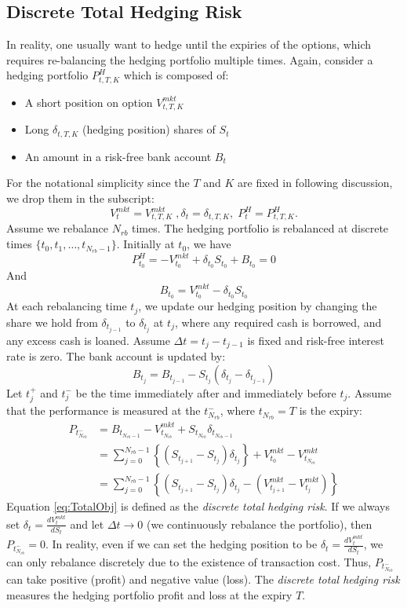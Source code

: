 \documentclass[letterpaper,12pt,titlepage,oneside,final]{book}
\numberwithin{equation}{section}
\theoremstyle{definition}
\newcommand{\Vmkt}{V^{mkt}}
\newcommand{\Smkt}{S}
\begin{document}
\subsection{Discrete Total Hedging Risk}
\label{sec:DiscreteTotalRisk}
In reality, one usually want to hedge until the expiries of the options, which requires re-balancing the hedging portfolio multiple times. Again,
consider a hedging portfolio $P^{H}_{t,T,K}$ which is composed of:
\begin{itemize}
	\item A short position on option $\Vmkt_{t,T,K}$
	\item Long $\delta_{t,T,K}$ (hedging position) shares of $\Smkt_t$
	\item An amount in a risk-free bank account $B_t$
\end{itemize}
For the notational simplicity since the $T$ and $K$ are fixed in following discussion, we drop them in the subscript:
\[
    \Vmkt_{t}=\Vmkt_{t,T,K}\;,\delta_{t}=\delta_{t,T,K},\; P^{H}_t=P^{H}_{t,T,K}.
\]
Assume we rebalance $N_{rb}$ times. The hedging portfolio is rebalanced at discrete times $\{t_0,t_1,\dots,t_{N_{rb}-1}\}$. 
Initially at $t_0$, we have
\[
P^H_{t_0}=  -V_{t_0}^{mkt}+\delta_{t_0} S_{t_0}+ B_{t_0}=0
\]
And
\[
B_{t_0}=V_{t_0}^{mkt}-\delta_{t_0} S_{t_0}
\]
At each rebalancing time $t_j$, we update our hedging position by changing the share we hold from $\delta_{t_{j-1}}$ to $\delta_{t_j}$ at $t_j$, where any required cash is borrowed, and any excess cash is loaned. Assume $\Delta t=t_{j}-t_{j-1}$ is fixed and risk-free interest rate is zero.
The bank account is updated by:
\[
B_{t_{j}}= B_{t_{j-1}}-S_{t_j}(\delta_{t_j}-\delta_{t_{j-1}})
\]
Let $t_j^+$ and $t_j^-$   be the time immediately after  and immediately before $t_j$. Assume that the performance is measured at the $t_{N_{rb}}^-$, where $t_{N_{rb}}=T$ is the expiry:
\begin{equation}
\begin{split}
P_{t_{N_{rb}}^-}&=B_{t_{N_{rb}-1}}- V_{t_{N_{rb}}}^{mkt}+ S_{t_{N_{rb}}} \delta_{t_{N_{rb}-1}}  \\
&=\sum_{j=0}^{N_{rb}-1}\left\{ \left(S_{t_{j+1}}-S_{t_{j}}\right) \delta_{t_j} \right\}+ V_{t_0}^{mkt}-V_{t_{N_{rb}}}^{mkt}\\
&=\sum_{j=0}^{N_{rb}-1}\left\{ \left( S_{t_{j+1}}-S_{t_{j}}\right) \delta_{t_j} -(V_{t_{j+1}}^{mkt}-V_{t_j}^{mkt}) \right\}
\end{split}
\label{eq:TotalObj}
\end{equation}
Equation \eqref{eq:TotalObj} is defined as the {\em discrete total hedging risk}.
If we always set $\delta_t=\frac{d V_t^{mkt}}{d S_t}$ and let $\Delta t \rightarrow 0$ (we continuously rebalance the portfolio), then $P_{t_{N_{rb}}^-}=0$. In reality, even if we can set the hedging position to be $\delta_t=\frac{d V_t^{mkt}}{d S_t}$,  we can only rebalance discretely due to the existence of transaction cost. Thus, $P_{t_{N_{rb}}^-}$ can take positive (profit) and negative value (loss).
The  {\em discrete total hedging risk} measures the hedging portfolio profit and loss at the expiry $T$. 
\end{document}
